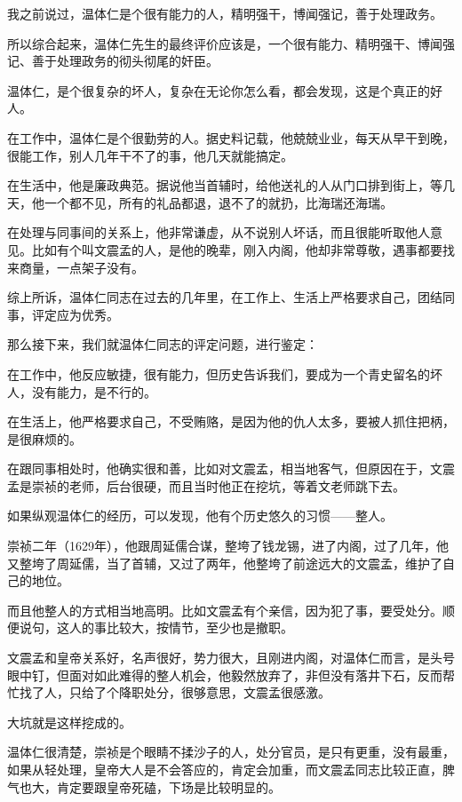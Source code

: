 \begin{multicols}{\theparacolNo}
		我之前说过，温体仁是个很有能力的人，精明强干，博闻强记，善于处理政务。

		所以综合起来，温体仁先生的最终评价应该是，一个很有能力、精明强干、博闻强记、善于处理政务的彻头彻尾的奸臣。

		温体仁，是个很复杂的坏人，复杂在无论你怎么看，都会发现，这是个真正的好人。

		在工作中，温体仁是个很勤劳的人。据史料记载，他兢兢业业，每天从早干到晚，很能工作，别人几年干不了的事，他几天就能搞定。

		在生活中，他是廉政典范。据说他当首辅时，给他送礼的人从门口排到街上，等几天，他一个都不见，所有的礼品都退，退不了的就扔，比海瑞还海瑞。

		在处理与同事间的关系上，他非常谦虚，从不说别人坏话，而且很能听取他人意见。比如有个叫文震孟的人，是他的晚辈，刚入内阁，他却非常尊敬，遇事都要找来商量，一点架子没有。

		综上所诉，温体仁同志在过去的几年里，在工作上、生活上严格要求自己，团结同事，评定应为优秀。

		那么接下来，我们就温体仁同志的评定问题，进行鉴定：

		在工作中，他反应敏捷，很有能力，但历史告诉我们，要成为一个青史留名的坏人，没有能力，是不行的。

		在生活上，他严格要求自己，不受贿赂，是因为他的仇人太多，要被人抓住把柄，是很麻烦的。

		在跟同事相处时，他确实很和善，比如对文震孟，相当地客气，但原因在于，文震孟是崇祯的老师，后台很硬，而且当时他正在挖坑，等着文老师跳下去。

		如果纵观温体仁的经历，可以发现，他有个历史悠久的习惯——整人。

		崇祯二年（1629年），他跟周延儒合谋，整垮了钱龙锡，进了内阁，过了几年，他又整垮了周延儒，当了首辅，又过了两年，他整垮了前途远大的文震孟，维护了自己的地位。

		而且他整人的方式相当地高明。比如文震孟有个亲信，因为犯了事，要受处分。顺便说句，这人的事比较大，按情节，至少也是撤职。

		文震孟和皇帝关系好，名声很好，势力很大，且刚进内阁，对温体仁而言，是头号眼中钉，但面对如此难得的整人机会，他毅然放弃了，非但没有落井下石，反而帮忙找了人，只给了个降职处分，很够意思，文震孟很感激。

		大坑就是这样挖成的。

		温体仁很清楚，崇祯是个眼睛不揉沙子的人，处分官员，是只有更重，没有最重，如果从轻处理，皇帝大人是不会答应的，肯定会加重，而文震孟同志比较正直，脾气也大，肯定要跟皇帝死磕，下场是比较明显的。


\end{multicols}
